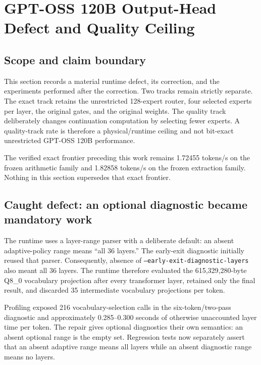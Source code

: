 \section{GPT-OSS 120B Output-Head Defect and Quality Ceiling}
\label{sec:gptoss120b-output-head-defect-20260911}

\subsection{Scope and claim boundary}

This section records a material runtime defect, its correction, and the
experiments performed after the correction.  Two tracks remain strictly
separate.  The exact track retains the unrestricted 128-expert router, four
selected experts per layer, the original gates, and the original weights.  The
quality track deliberately changes continuation computation by selecting fewer
experts.  A quality-track rate is therefore a physical/runtime ceiling and not
bit-exact unrestricted GPT-OSS 120B performance.

The verified exact frontier preceding this work remains 1.72455 tokens/s on
the frozen arithmetic family and 1.82858 tokens/s on the frozen extraction
family.  Nothing in this section supersedes that exact frontier.

\subsection{Caught defect: an optional diagnostic became mandatory work}

The runtime uses a layer-range parser with a deliberate default: an absent
adaptive-policy range means ``all 36 layers.''  The early-exit diagnostic
initially reused that parser.  Consequently, absence of
\texttt{--early-exit-diagnostic-layers} also meant all 36 layers.  The runtime
therefore evaluated the 615,329,280-byte Q8\_0 vocabulary projection after
every transformer layer, retained only the final result, and discarded 35
intermediate vocabulary projections per token.

Profiling exposed 216 vocabulary-selection calls in the six-token/two-pass
diagnostic and approximately 0.285--0.300 seconds of otherwise unaccounted
layer time per token.  The repair gives optional diagnostics their own
semantics: an absent optional range is the empty set.  Regression tests now
separately assert that an absent adaptive range means all layers while an
absent diagnostic range means no layers.

